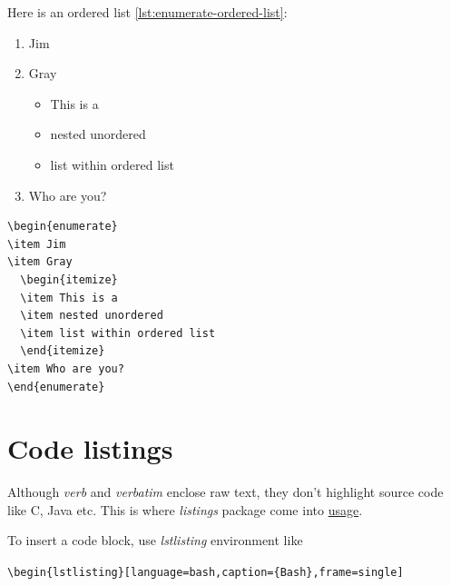 Here is an ordered list \ref{lst:enumerate-ordered-list}:

\begin{minipage}{.4\linewidth}
  \begin{enumerate}
  \item Jim
  \item Gray
    \begin{itemize}
    \item This is a
    \item nested unordered
    \item list within ordered list
    \end{itemize}
  \item Who are you?
  \end{enumerate}
\end{minipage}
\hfill{}
\begin{minipage}{.4\linewidth}
\begin{lstlisting}[label={lst:enumerate-ordered-list}]
\begin{enumerate}
\item Jim
\item Gray
  \begin{itemize}
  \item This is a
  \item nested unordered
  \item list within ordered list
  \end{itemize}
\item Who are you?
\end{enumerate}
\end{lstlisting}
\end{minipage}

\section{Code listings}
\label{sec:code-listings}

Although \textit{verb} and \textit{verbatim} enclose raw text,
they don't highlight source code like C, Java etc. This is where
\textit{listings} package come into
\href{https://en.wikibooks.org/wiki/LaTeX/Source_Code_Listings}{usage}.

To insert a code block, use \textit{lstlisting} environment like

\begin{center}
  \verb|\begin{lstlisting}[language=bash,caption={Bash},frame=single]|
\end{center}

